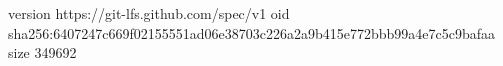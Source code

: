 version https://git-lfs.github.com/spec/v1
oid sha256:6407247c669f02155551ad06e38703c226a2a9b415e772bbb99a4e7c5c9bafaa
size 349692
